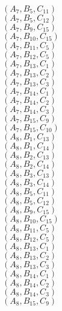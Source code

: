 \documentclass[14pt]{article}
\begin{document}
    $({A}_{7}, {B}_{5}, {C}_{11}) $ \\ 
    $({A}_{7}, {B}_{5}, {C}_{12}) $ \\ 
    $({A}_{7}, {B}_{9}, {C}_{15}) $ \\ 
    $({A}_{7}, {B}_{10}, {C}_{15}) $ \\ 
    $({A}_{7}, {B}_{11}, {C}_{5}) $ \\ 
    $({A}_{7}, {B}_{12}, {C}_{5}) $ \\ 
    $({A}_{7}, {B}_{13}, {C}_{1}) $ \\ 
    $({A}_{7}, {B}_{13}, {C}_{2}) $ \\ 
    $({A}_{7}, {B}_{13}, {C}_{3}) $ \\ 
    $({A}_{7}, {B}_{14}, {C}_{1}) $ \\ 
    $({A}_{7}, {B}_{14}, {C}_{2}) $ \\ 
    $({A}_{7}, {B}_{14}, {C}_{3}) $ \\ 
    $({A}_{7}, {B}_{15}, {C}_{9}) $ \\ 
    $({A}_{7}, {B}_{15}, {C}_{10}) $ \\ 
    $({A}_{8}, {B}_{1}, {C}_{13}) $ \\ 
    $({A}_{8}, {B}_{1}, {C}_{14}) $ \\ 
    $({A}_{8}, {B}_{2}, {C}_{13}) $ \\ 
    $({A}_{8}, {B}_{2}, {C}_{14}) $ \\ 
    $({A}_{8}, {B}_{3}, {C}_{13}) $ \\ 
    $({A}_{8}, {B}_{3}, {C}_{14}) $ \\ 
    $({A}_{8}, {B}_{5}, {C}_{11}) $ \\ 
    $({A}_{8}, {B}_{5}, {C}_{12}) $ \\ 
    $({A}_{8}, {B}_{9}, {C}_{15}) $ \\ 
    $({A}_{8}, {B}_{10}, {C}_{15}) $ \\ 
    $({A}_{8}, {B}_{11}, {C}_{5}) $ \\ 
    $({A}_{8}, {B}_{12}, {C}_{5}) $ \\ 
    $({A}_{8}, {B}_{13}, {C}_{1}) $ \\ 
    $({A}_{8}, {B}_{13}, {C}_{2}) $ \\ 
    $({A}_{8}, {B}_{13}, {C}_{3}) $ \\ 
    $({A}_{8}, {B}_{14}, {C}_{1}) $ \\ 
    $({A}_{8}, {B}_{14}, {C}_{2}) $ \\ 
    $({A}_{8}, {B}_{14}, {C}_{3}) $ \\ 
    $({A}_{8}, {B}_{15}, {C}_{9}) $ \\ 
\end{document}

